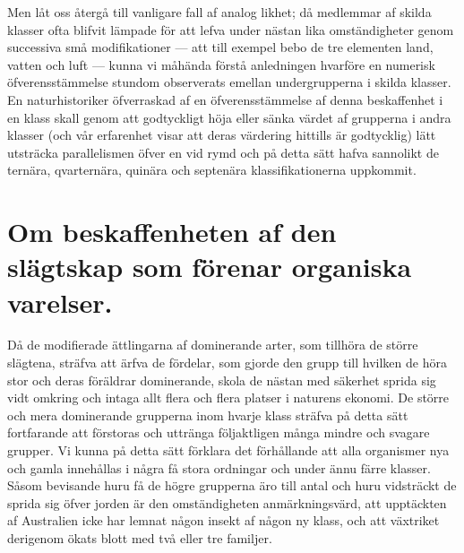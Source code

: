 Men låt oss återgå till vanligare fall af analog likhet; då medlemmar af skilda klasser ofta blifvit lämpade för att lefva under nästan lika omständigheter genom successiva små modifikationer — att till exempel bebo de tre elementen land, vatten och luft — kunna vi måhända förstå anledningen hvarföre en numerisk öfverensstämmelse stundom observerats emellan undergrupperna i skilda klasser. En naturhistoriker öfverraskad af en öfverensstämmelse af denna beskaffenhet i en klass skall genom att godtyckligt höja eller sänka värdet af grupperna i andra klasser (och vår erfarenhet visar att deras värdering hittills är godtycklig) lätt utsträcka parallelismen öfver en vid rymd och på detta sätt hafva sannolikt de ternära, qvarternära, quinära och septenära klassifikationerna uppkommit.



\section[Beskaffenheten hos slägtskapen]{Om beskaffenheten af den slägtskap som förenar
organiska varelser.}

Då de modifierade ättlingarna af dominerande arter, som tillhöra de större slägtena, sträfva att ärfva de fördelar, som gjorde den grupp till hvilken de höra stor och deras föräldrar dominerande, skola de nästan med säkerhet sprida sig vidt omkring och intaga allt flera och flera platser i naturens ekonomi. De större och mera dominerande grupperna inom hvarje klass sträfva på detta sätt fortfarande att förstoras och uttränga följaktligen många mindre och svagare grupper. Vi kunna på detta sätt förklara det förhållande att alla organismer nya och gamla innehållas i några få stora ordningar och under ännu färre klasser. Såsom bevisande huru få de högre grupperna äro till antal och huru vidsträckt de sprida sig öfver jorden är den omständigheten anmärkningsvärd, att upptäckten af Australien icke har lemnat någon insekt af någon ny klass, och att växtriket derigenom ökats blott med två eller tre familjer.

